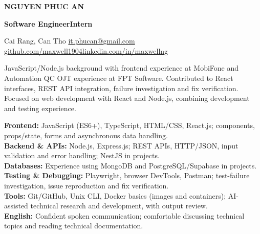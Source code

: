 \documentclass[10pt,a4paper]{article}
\newcommand{\cvsection}[1]{\par\vspace{8pt}{\color{accent}\sffamily\fontsize{9.5pt}{12pt}\selectfont\bfseries\MakeUppercase{#1}}\par\nopagebreak[4]\vspace{2.5pt}{\color{rulecolor}\hrule height 0.35pt}\nopagebreak[4]\vspace{5pt}}
\begin{document}
\color{ink}\fontsize{10.25pt}{12.5pt}\selectfont\raggedright
{}
{\fontsize{20pt}{24pt}\selectfont\bfseries NGUYEN PHUC AN}\par\vspace{4pt}
{\color{accent}\sffamily\fontsize{12pt}{15pt}\selectfont\bfseries Software Engineer\enspace\textbar\enspace Intern}\par\vspace{5pt}
{\color{muted}\fontsize{9.5pt}{12pt}\selectfont
Cai Rang, Can Tho \enspace\textbullet{} \enspace\textbullet\enspace \href{mailto:it.phucan@gmail.com}{it.phucan@gmail.com}\\[1pt]
\href{https://github.com/maxwell1904}{github.com/maxwell1904}\enspace\textbullet\enspace\href{https://www.linkedin.com/in/maxwellng}{linkedin.com/in/maxwellng}\par}

\cvsection{Profile}
JavaScript/Node.js background with frontend experience at MobiFone and Automation QC OJT experience at FPT Software. Contributed to React interfaces, REST API integration, failure investigation and fix verification. Focused on web development with React and Node.js, combining development and testing experience.

\cvsection{Skills}
\textbf{Frontend:} JavaScript (ES6+), TypeScript, HTML/CSS, React.js; components, props/state, forms and asynchronous data handling.\\[2pt]
\textbf{Backend \& APIs:} Node.js, Express.js; REST APIs, HTTP/JSON, input validation and error handling; NestJS in projects.\\[2pt]
\textbf{Databases:} Experience using MongoDB and PostgreSQL/Supabase in projects.\\[2pt]
\textbf{Testing \& Debugging:} Playwright, browser DevTools, Postman; test-failure investigation, issue reproduction and fix verification.\\[2pt]
\textbf{Tools:} Git/GitHub, Unix CLI, Docker basics (images and containers); AI-assisted technical research and development, with output review.\\[2pt]
\textbf{English:} Confident spoken communication; comfortable discussing technical topics and reading technical documentation.
\end{document}
